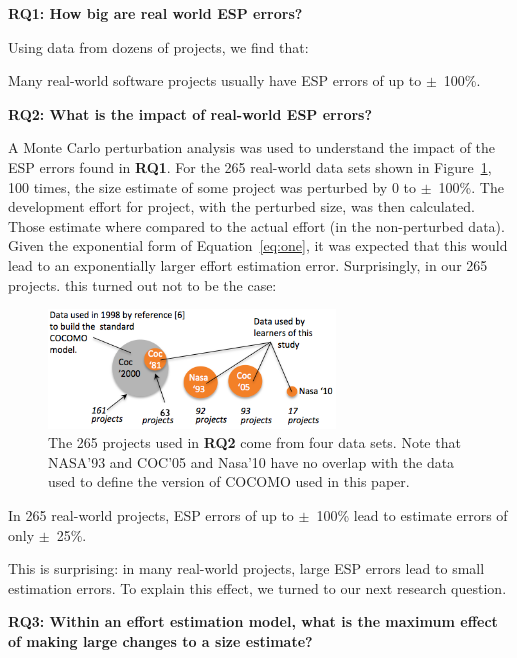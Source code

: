 \documentclass[final,twocolumn]{elsarticle}
\newcommand{\fig}[1]{Figure~\ref{fig:#1}}
\newcommand{\eq}[1]{Equation~\ref{eq:#1}}
\theoremstyle{break}
\begin{document}
{\bf RQ1: How big are real world ESP errors?}

Using data from dozens of projects, we find that:

\begin{lesson0}
  Many real-world software projects usually have ESP errors of up to $\pm$~100\%.
\end{lesson0}

{\bf RQ2: What is the impact of real-world ESP errors?}

A Monte Carlo perturbation analysis was used
to understand the impact of the ESP errors found in {\bf RQ1}.
For the 265 real-world data sets shown in \fig{dataused}, 100 times, the size estimate of some project was perturbed by
0 to $\pm$~100\%. The development effort
for project, with the perturbed size, was then calculated.
Those  estimate where  compared to the actual effort (in the non-perturbed data).
Given the exponential form of \eq{one}, it was expected that this would
lead to an exponentially larger effort estimation error. Surprisingly,
in our 265 projects.
this turned out not to be the case:

\begin{figure}[!t]
\begin{center}
\includegraphics[width=3in]{Figs/datasets1.png}
\end{center}
\caption{The 265 projects used in {\bf RQ2}
  come from four data sets.
   Note that NASA'93 and
COC'05 and Nasa'10 have no
overlap with the data used to define the version of COCOMO
used in this paper.}
\label{fig:dataused}
\end{figure}

\begin{lesson0}
  In 265 real-world projects,
  ESP errors of up to $\pm$~100\% lead to estimate errors of only $\pm$~25\%.
\end{lesson0}

This is surprising: in many real-world projects, large ESP errors
lead to  small estimation errors.
To explain this effect, we turned to our next research question.

{\bf RQ3:
Within an effort estimation model, what is the maximum effect of making large changes to a size estimate?}
\end{document}
